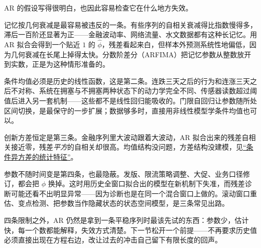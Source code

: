 AR 的假设写得很明白，也因此容易检查它在什么地方失效。

记忆按几何衰减是最容易被违反的一条。有些序列的自相关衰减得比指数慢得多，滞后一百阶还显著为正——金融波动率、网络流量、水文数据都有这种长记忆。用 AR 拟合会得到一个贴近 \(1\) 的 \(\hat\phi\)，残差看起来白，但样本外预测系统性地偏低，因为几何衰减在长尾上掉得太快。分数阶差分（ARFIMA）把记忆参数从整数放开到实数，正是为这种情形准备的。

条件均值必须是历史的线性函数，这是第二条。连跌三天之后的行为和连涨三天之后不对称、系统在拥塞与不拥塞两种状态下的动力学完全不同、传感器读数超过阈值后进入另一套机制——这些都不是线性回归能吸收的。门限自回归让参数随所处区间切换，是最保守的一步扩展；数据够多时，直接用非线性模型学条件均值也可以。

创新方差恒定是第三条。金融序列里大波动跟着大波动，AR 拟合出来的残差自相关接近零，残差\emph{平方}的自相关却很高。均值结构没问题，方差结构没建模，见\hyperref[sec:11-Mathematical-Statistics/10-GARCH-and-Volatility/01]{``条件异方差的统计特征''}。

参数不随时间变是第四条，也最隐蔽。发版、限流策略调整、大促、业务口径修订，都会把 \(\phi\) 换掉。这时用历史全窗口拟合出的模型在新机制下失准，而残差诊断可能还看不出明显异常——因为诊断也是在同一个混合窗口上做的。滚动窗口重估、变点检测、把参数当作隐藏状态的状态空间模型，是三条常见出路。

四条限制之外，AR 仍然是拿到一条平稳序列时最该先试的东西：参数少，估计快，每一个数都能解释，失效方式清楚。下一节松开一个前提——不再要求历史值必须直接出现在方程右边，改让过去的冲击自己留下有限长度的回声。
